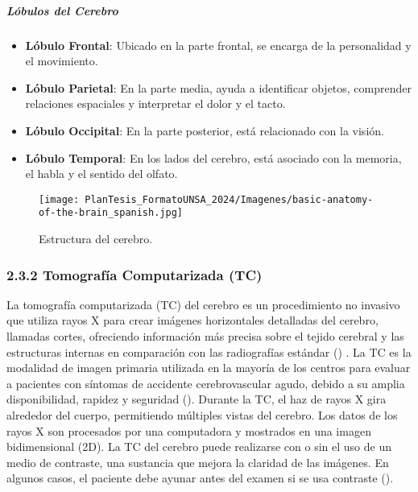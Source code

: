 \subparagraph{Lóbulos del Cerebro}

\begin{itemize}
    \item \textbf{Lóbulo Frontal}: Ubicado en la parte frontal, se encarga de la personalidad y el movimiento.
    \item \textbf{Lóbulo Parietal}: En la parte media, ayuda a identificar objetos, comprender relaciones espaciales y interpretar el dolor y el tacto.
    \item \textbf{Lóbulo Occipital}: En la parte posterior, está relacionado con la visión.
    \item \textbf{Lóbulo Temporal}: En los lados del cerebro, está asociado con la memoria, el habla y el sentido del olfato.
\end{itemize}
\cite{hopkins_ct_brain}
\begin{figure}[!h]
	\centering
	\texttt{[image: PlanTesis\_FormatoUNSA\_2024/Imagenes/basic-anatomy-of-the-brain\_spanish.jpg]}
    \caption{Estructura del cerebro.}
    \label{fig:estructura_cerebro}
\end{figure}



\subsubsection{2.3.2 Tomografía Computarizada (TC)}

La tomografía computarizada (TC) del cerebro es un procedimiento no invasivo que utiliza rayos X para crear imágenes horizontales detalladas del cerebro, llamadas cortes, ofreciendo información más precisa sobre el tejido cerebral y las estructuras internas en comparación con las radiografías estándar (\cite{hopkins_ct_brain}) . La TC es la modalidad de imagen primaria utilizada en la mayoría de los centros para evaluar a pacientes con síntomas de accidente cerebrovascular agudo, debido a su amplia disponibilidad, rapidez y seguridad (\cite{peralta_agudelo_2023}).
\newline
Durante la TC, el haz de rayos X gira alrededor del cuerpo, permitiendo múltiples vistas del cerebro. Los datos de los rayos X son procesados por una computadora y mostrados en una imagen bidimensional (2D).
\newline
La TC del cerebro puede realizarse con o sin el uso de un medio de contraste, una sustancia que mejora la claridad de las imágenes. En algunos casos, el paciente debe ayunar antes del examen si se usa contraste
(\cite{hopkins_ct_brain}).

